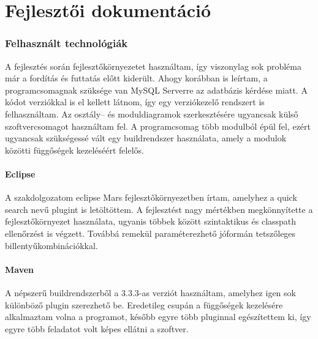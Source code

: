 \part{Fejlesztői dokumentáció}

\section{Felhasznált technológiák}
A fejlesztés során fejlesztőkörnyezetet használtam, így viszonylag sok probléma már a fordítás és futtatás előtt kiderült. Ahogy korábban is leírtam, a programcsomagnak szüksége van MySQL Serverre az adatbázis kérdése miatt. A kódot verziókkal is el kellett látnom, így egy verziókezelő rendszert is felhasználtam. Az osztály-- és moduldiagramok szerkesztésére ugyancsak külső szoftvercsomagot használtam fel. A programcsomag több modulból épül fel, ezért ugyancsak szükségessé vált egy buildrendszer használata, amely a modulok közötti függőségek kezeléséért felelős.

\subsection{Eclipse}
A szakdolgozatom eclipse Mars \cite{eclipse_mars} fejlesztőkörnyezetben írtam, amelyhez a quick search \cite{quick_search} nevű plugint is letöltöttem. A fejlesztést nagy mértékben megkönnyítette a fejlesztőkörnyezet használata, ugyanis többek között szintaktikus és classpath ellenőrzést is végzett. Továbbá remekül paraméterezhető jóformán tetszőleges billentyűkombinációkkal.

\subsection{Maven}
A népszerű buildrendszerből a 3.3.3-as verziót használtam, amelyhez igen sok különböző plugin szerezhető be. Eredetileg csupán a függőségek kezelésére alkalmaztam volna a programot, később egyre több pluginnal egészítettem ki, így egyre több feladatot volt képes ellátni a szoftver.

